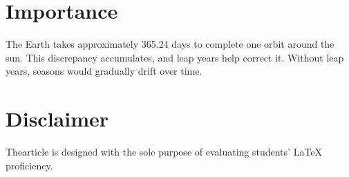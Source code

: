 \documentclass[12pt]{article}
\begin{document}
 
\section{Importance}
The Earth takes approximately 365.24 days to complete one orbit around the sun. This discrepancy accumulates, and leap years help correct it. Without leap years, seasons would gradually drift over time.


\section*{Disclaimer}
 Thearticle is designed with the sole purpose of evaluating students’  \LaTeX 
 proficiency.


\end{document}
